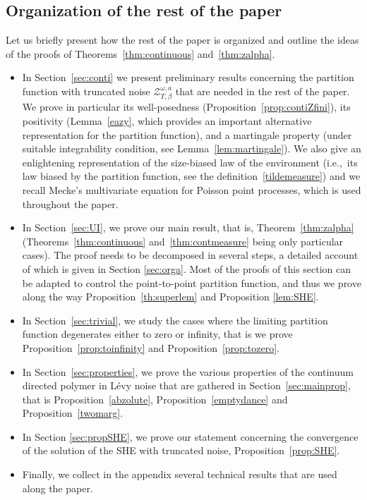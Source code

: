 \documentclass[11pt]{article}
\newcommand{\ie}{i.e.,\xspace}
\numberwithin{equation}{section}
\let\mathcal\mathscr
\theoremstyle{definition}
\newcommand{\cZ}{{\ensuremath{\mathcal Z}} }
\let\gb\beta
\let\go\omega
\begin{document}
\subsection{Organization of the rest of the paper}

Let us briefly present how the rest of the paper is organized and outline the ideas of the proofs of Theorems~\ref{thm:continuous}
and~\ref{thm:zalpha}.

\begin{itemize}
\item
In Section~\ref{sec:conti} we present preliminary
results concerning the partition function with truncated noise $\cZ_{T,\gb}^{\go,a}$ that are needed in the rest of the paper.
We prove in particular its well-posedness (Proposition~\ref{prop:contiZfini}), its positivity (Lemma~\ref{eazy}, which provides an important alternative representation for the partition function),
and a martingale property (under suitable integrability condition, see Lemma~\ref{lem:martingale}).
We also give an enlightening representation of
the size-biased law of the environment (\ie \ its law biased by the partition function, see the definition~\eqref{tildemeasure})
and we recall Mecke's multivariate equation for Poisson point processes, which is used throughout the paper.

\item
In Section~\ref{sec:UI}, we prove our main result, that is, Theorem~\ref{thm:zalpha}
(Theorems~\ref{thm:continuous} and~\ref{thm:contmeasure} being only particular cases).
The proof needs to be decomposed in several steps, a detailed account of which is given in Section \ref{sec:orga}. Most of the proofs of this section can be adapted to control the point-to-point
partition function, and thus we prove along the way Proposition~\ref{th:superlem} and Proposition \ref{lem:SHE}.

\item
In Section~\ref{sec:trivial}, we study the cases where the limiting partition function degenerates either to zero or infinity, that is we prove Proposition~\ref{prop:toinfinity} and
Proposition~\ref{prop:tozero}.

\item
In Section~\ref{sec:properties}, we prove the various properties of the continuum directed polymer in Lévy noise
that are gathered in Section~\ref{sec:mainprop},
that is
Proposition~\ref{abzolute},
Proposition~\ref{emptydance}
and
Proposition~\ref{twomarg}.

\item
In Section \ref{sec:propSHE},
we prove our statement concerning the convergence of the solution of the SHE with truncated noise, Proposition~\ref{prop:SHE}.

\item
Finally, we collect in the appendix several technical results that are used along the paper.
\end{itemize}
\end{document}
